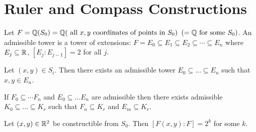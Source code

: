 \section{Ruler and Compass Constructions}

\begin{definition}
    Let \(F = \mathbb{Q}(S_0) = \mathbb{Q}(\text{ all } x, y \text{ coordinates of points in } S_0)\) \((= \mathbb{Q} \text{ for some } S_0)\). An admissible tower is a tower of extensions: \(F = E_0 \subseteq E_1 \subseteq E_2 \subseteq \cdots \subseteq E_n\) where \(E_j \subseteq \mathbb{R}\), \([E_j : E_{j - 1}] = 2\) for all \(j\).
\end{definition}

\begin{theorem}
    Let \((x, y) \in S_i\). Then there exists an admissible tower \(E_0 \subseteq \dots \subseteq E_n\) such that \(x, y \in E_n\).
\end{theorem}

\begin{lemma}
    If \(F_0 \subseteq \cdots F_n\) and \(E_0 \subseteq \dots E_n\) are admissible then there exists admissible \(K_0 \subseteq \dots \subseteq K_r\) such that \(F_n \subseteq K_r\) and \(E_m \subseteq K_r\).
\end{lemma}

\begin{corollary}
    Let \((x, y) \in \mathbb{R}^2\) be constructible from \(S_0\). Then \([F(x, y) : F] = 2^k\) for some \(k\).
\end{corollary}